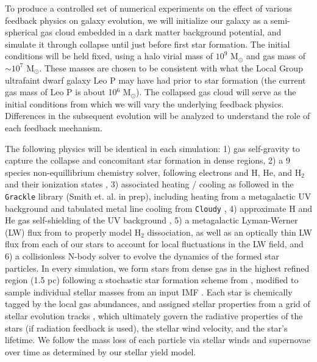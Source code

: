 \documentclass[11pt]{article}
\begin{document}
To produce a controlled set of numerical experiments on the effect of various feedback physics on galaxy evolution, we will initialize our galaxy as a semi-spherical gas cloud embedded in a dark matter background potential, and simulate it through collapse until just before first star formation. The initial conditions will be held fixed, using a halo virial mass of $10^{9}$ M$_{\odot}$ and gas mass of $\sim10^{7}$ M$_{\odot}$. These masses are chosen to be consistent with what the Local Group ultrafaint dwarf galaxy Leo P \citep{McQuinn2013, Giovanelli2013, Skillman2013, McQuinn2015} may have had prior to star formation (the current gas mass of Leo P is about 10$^{6}$ M$_{\odot}$). The collapsed gas cloud will serve as the initial conditions from which we will vary the underlying feedback physics. Differences in the subsequent evolution will be analyzed to understand the role of each feedback mechanism. 

The following physics will be identical in each simulation: 1) gas self-gravity to capture the collapse and concomitant star formation in dense regions, 2) a 9 species non-equillibrium chemistry solver, following electrons and H, He, and H$_{2}$ and their ionization states \citep{Anninos1997, Abel1997}, 3) associated heating / cooling as followed in the \texttt{Grackle} library (Smith et. al. in prep), including heating from a metagalactic UV background \citep{HM2012} and tabulated metal line cooling from \texttt{Cloudy} \citep{Cloudy2013}, 4) approximate H and He gas self-shielding of the UV background \citep{Rahmati2013}, 5) a metagalactic Lyman-Werner (LW) flux from \cite{HM2012} to properly model H$_{2}$ dissociation, as well as an optically thin LW flux from each of our stars to account for local fluctuations in the LW field, and 6) a collisionless N-body solver to evolve the dynamics of the formed star particles. In every simulation, we form stars from dense gas in the highest refined region (1.5 pc) following a stochastic star formation scheme from \cite{Goldbaum2015, Goldbaum2016}, modified to sample individual stellar masses from an input IMF \citep{Salpeter1955}. Each star is chemically tagged by the local gas abundances, and assigned stellar properties from a grid of stellar evolution tracks \citep{Bressan2012}, which ultimately govern the radiative properties of the stars (if radiation feedback is used), the stellar wind velocity, and the star's lifetime. We follow the mass loss of each particle via stellar winds and supernovae over time as determined by our stellar yield model.
\end{document}
